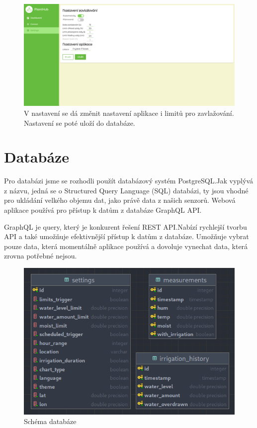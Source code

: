 \documentclass[12pt,a4paper]{article}
\begin{document}
\begin{figure}[h]
	\centering
	\includegraphics[width=\linewidth]{web-ui-settings.png}
	\caption{V nastavení se dá změnit nastavení aplikace i limitů pro
		zavlažování. Nastavení se poté uloží do databáze.}
\end{figure}

\clearpage

\section{Databáze}

Pro databázi jsme se rozhodli použít databázový systém PostgreSQL.\@ Jak vyplývá z názvu, jedná se o Structured Query Language (SQL) databázi, ty jsou vhodné pro ukládání velkého objemu dat, jako právě data z našich senzorů. Webová aplikace používá pro přístup k datům z databáze GraphQL \ac{API}.\@

GraphQL je query, který je konkurent řešení \ac{REST} \ac{API}.\@ Nabízí rychlejší
tvorbu \ac{API} a také umožňuje efektivnější přístup k datům z databáze. Umožňuje
vybrat pouze data, která momentálně aplikace používá a dovoluje vynechat data,
která zrovna potřebné nejsou.

\begin{figure}[h]
	\centering
	\includegraphics[width=0.9\linewidth]{db.png}
	\caption{Schéma databáze}
\end{figure}
\end{document}
